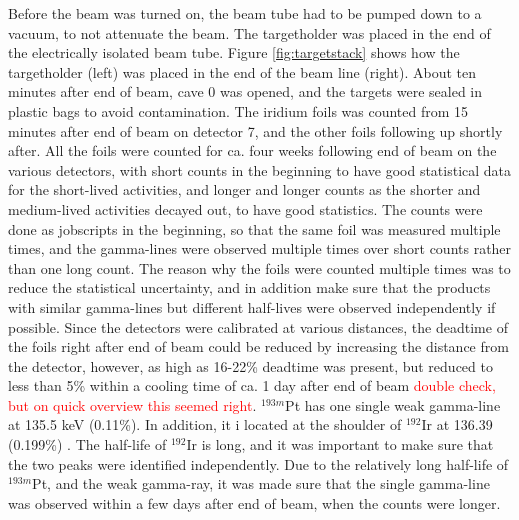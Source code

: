 Before the beam was turned on, the beam tube had to be pumped down to a vacuum, to not attenuate the beam. The targetholder was placed in the end of the electrically isolated beam tube. Figure \ref{fig:targetstack} shows how the targetholder (left) was placed in the end of the beam line (right). About ten minutes after end of beam, cave 0 was opened, and the targets were sealed in plastic bags to avoid contamination. The iridium foils was counted from 15 minutes after end of beam on detector 7, and the other foils following up shortly after. All the foils were counted for ca. four weeks following end of beam on the various detectors, with short counts in the beginning to have good statistical data for the short-lived activities, and longer and longer counts as the shorter and medium-lived activities decayed out, to have good statistics. The counts were done as jobscripts in the beginning, so that the same foil was measured multiple times, and the gamma-lines were observed multiple times over short counts rather than one long count. The reason why the foils were counted multiple times was to reduce the statistical uncertainty, and in addition make sure that the products with similar gamma-lines but different half-lives were observed independently if possible. Since the detectors were calibrated at various distances, the deadtime of the foils right after end of beam could be reduced by increasing the distance from the detector, however, as high as  16-22\% deadtime was present, but reduced to less than 5\% within a cooling time of ca. 1 day after end of beam \textcolor{red}{double check, but on quick overview this seemed right}.
$^{193m}$Pt has one single weak gamma-line at 135.5 keV (0.11\%). In addition, it i located at the shoulder of $^{192}$Ir at 136.39 (0.199\%) \cite{ShamsuzzohaBasunia2017a, Baglin2012}. The half-life of $^{192}$Ir is long, and it was important to make sure that the two peaks were identified independently. 
Due to the relatively long half-life of $^{193m}$Pt, and the weak gamma-ray, it was made sure that the single gamma-line was observed within a few days after end of beam, when the counts were longer. 

\noindent 


